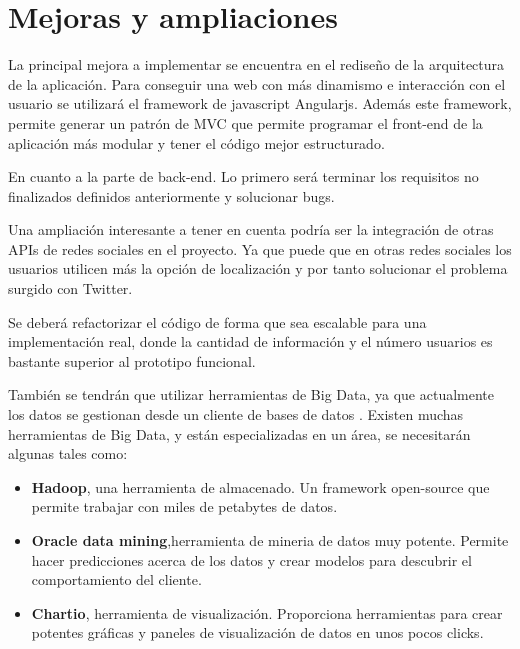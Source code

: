 \section{Mejoras y ampliaciones}

La principal mejora a implementar se encuentra en el rediseño de la arquitectura de la aplicación. Para conseguir una web con más dinamismo e interacción con el usuario se utilizará el
framework de javascript Angularjs. Además este framework, permite generar un patrón de MVC que permite programar el front-end de la aplicación más modular y tener el código mejor estructurado.

\vspace{5 mm}

En cuanto a la parte de back-end. Lo primero será terminar los requisitos no finalizados definidos anteriormente y solucionar bugs.

Una ampliación interesante a tener en cuenta podría ser la integración de otras APIs de redes sociales en el proyecto. Ya que puede que en otras redes
sociales los usuarios utilicen más la opción de localización y por tanto solucionar el problema surgido con Twitter.


Se deberá refactorizar el código de forma que sea escalable para una implementación real, donde la cantidad de información y el número
usuarios es bastante superior al prototipo funcional.

\vspace{5 mm}

También se tendrán que utilizar herramientas de Big Data, ya que actualmente los datos se gestionan desde un cliente de bases de datos \cite{big-data-tools}.
Existen muchas herramientas de Big Data, y están especializadas en un área, se necesitarán algunas tales como:


\begin{itemize}
  \item \textbf{Hadoop}, una herramienta de almacenado. Un framework open-source que permite trabajar con miles de petabytes de datos.
  \item \textbf{Oracle data mining},herramienta de mineria de datos muy potente. Permite hacer predicciones acerca de los datos y crear modelos para descubrir el comportamiento del cliente.
  \item \textbf{Chartio}, herramienta de visualización. Proporciona herramientas para crear potentes gráficas y paneles de visualización de datos en
  unos pocos clicks.
\end{itemize}

